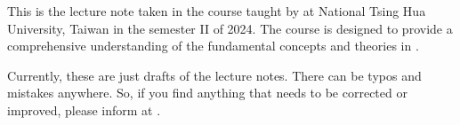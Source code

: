 \begin{myminipage} 
     This is the lecture note taken in the course \textit{\courseloc} taught by \profloc{} at 
     National Tsing Hua University, Taiwan in the semester II of 2024.
     The course is designed to provide a comprehensive understanding of the fundamental concepts and theories in \courseloc{}.

     Currently, these are just drafts of the lecture notes. There can be typos and mistakes anywhere.
     So, if you find anything that needs to be corrected or improved, please inform at \myemailloc. \bigskip
\end{myminipage}
